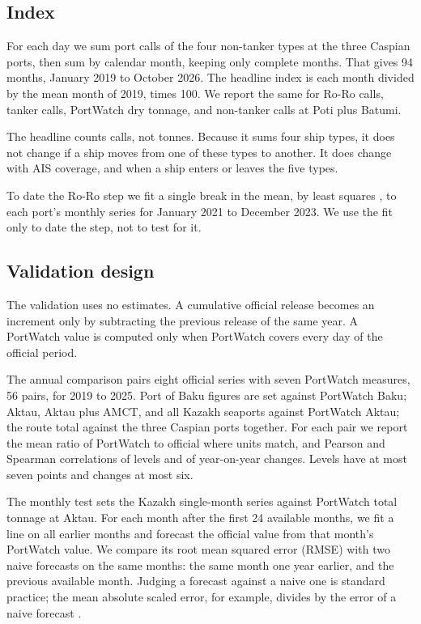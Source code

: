 \documentclass[11pt,a4paper]{article}
\begin{document}
\subsection{Index}

For each day we sum port calls of the four non-tanker types at the three Caspian ports, then sum by calendar month, keeping only complete months. That gives 94 months, January 2019 to October 2026. The headline index is each month divided by the mean month of 2019, times 100. We report the same for Ro-Ro calls, tanker calls, PortWatch dry tonnage, and non-tanker calls at Poti plus Batumi.

The headline counts calls, not tonnes. Because it sums four ship types, it does not change if a ship moves from one of these types to another. It does change with AIS coverage, and when a ship enters or leaves the five types.

To date the Ro-Ro step we fit a single break in the mean, by least squares \cite{bai1997estimation}, to each port's monthly series for January 2021 to December 2023. We use the fit only to date the step, not to test for it.

\subsection{Validation design}

The validation uses no estimates. A cumulative official release becomes an increment only by subtracting the previous release of the same year. A PortWatch value is computed only when PortWatch covers every day of the official period.

The annual comparison pairs eight official series with seven PortWatch measures, 56 pairs, for 2019 to 2025. Port of Baku figures are set against PortWatch Baku; Aktau, Aktau plus AMCT, and all Kazakh seaports against PortWatch Aktau; the route total against the three Caspian ports together. For each pair we report the mean ratio of PortWatch to official where units match, and Pearson and Spearman correlations of levels and of year-on-year changes. Levels have at most seven points and changes at most six.

The monthly test sets the Kazakh single-month series against PortWatch total tonnage at Aktau. For each month after the first 24 available months, we fit a line on all earlier months and forecast the official value from that month's PortWatch value. We compare its root mean squared error (RMSE) with two naive forecasts on the same months: the same month one year earlier, and the previous available month. Judging a forecast against a naive one is standard practice; the mean absolute scaled error, for example, divides by the error of a naive forecast \cite{hyndman2006another}.
\end{document}

